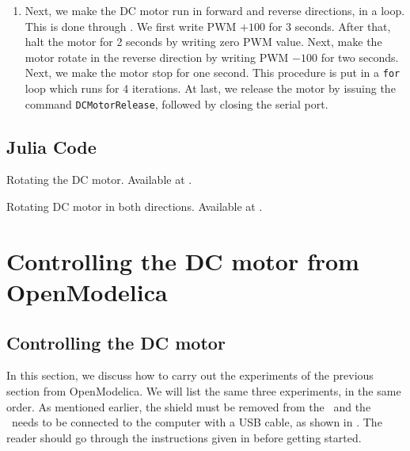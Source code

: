 \begin{enumerate}
  \item Next, we make the DC motor run in forward and reverse
        directions, in a loop.  This is done through
        .  We first write PWM $+100$ for 3
        seconds.  After that, halt the motor for 2 seconds by writing zero PWM value.  
        Next, make the motor rotate in the reverse direction by writing PWM $-100$ for two seconds.  
        Next, we make the motor stop for one second. This procedure is put in a {\tt for} loop which runs for 4 iterations.
        At last, we release the motor by issuing the command {\tt DCMotorRelease}, followed by closing the serial port. 
        
\end{enumerate}


\subsection{Julia Code}
\label{sec:dcmotor-julia-code}

\begin{juliacode}
  {Rotating the DC motor.  Available at
    .}
  \label{julia:dcmotor-clock}
  
\end{juliacode}

\begin{juliacode}
  {Rotating DC motor in both directions.  Available at
    .}
  \label{julia:dcmotor-both}
  
\end{juliacode}

\begin{juliacode}
  \label{julia:dcmotor-loop}
  
\end{juliacode}


\section{Controlling the DC motor from OpenModelica}
\subsection{Controlling the DC motor}
In this section, we discuss how to carry out the experiments of the
previous section from OpenModelica.  We will list the same three experiments,
in the same order.  As mentioned earlier, the shield must be removed from 
the \arduino\ and the \arduino\ needs to be connected to the computer 
with a USB cable, as shown in . The reader should go through the instructions given in
 before getting started.



